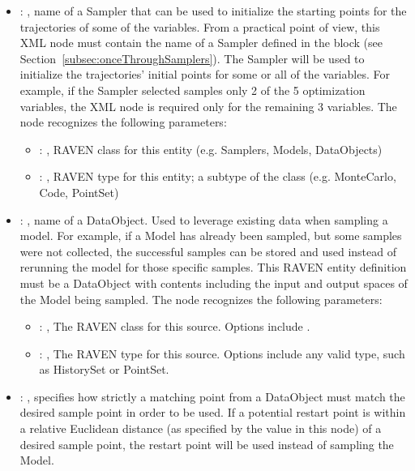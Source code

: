 \begin{itemize}
    \item {}: , 
      name of a Sampler that can be used to initialize the starting points for the trajectories
      of some of the variables. From a practical point of view, this XML node must contain the
      name of a Sampler defined in the  block (see
      Section~\ref{subsec:onceThroughSamplers}).               The Sampler will be used to
      initialize the trajectories' initial points for some or all               of the variables.
      For example, if the Sampler selected samples only 2 of the 5 optimization
      variables, the  XML node is required only for the remaining 3 variables.
      The  node recognizes the following parameters:
        \begin{itemize}
          \item {}: , 
            RAVEN class for this entity (e.g. Samplers, Models, DataObjects)
          \item {}: , 
            RAVEN type for this entity; a subtype of the class (e.g. MonteCarlo, Code, PointSet)
      \end{itemize}

    \item {}: , 
      name of a DataObject. Used to leverage existing data when sampling a model. For
      example, if a Model has               already been sampled, but some samples were not
      collected, the successful samples can               be stored and used instead of rerunning
      the model for those specific samples. This RAVEN               entity definition must be a
      DataObject with contents including the input and output spaces               of the Model
      being sampled.
      The  node recognizes the following parameters:
        \begin{itemize}
          \item {}: , 
            The RAVEN class for this source. Options include .
          \item {}: , 
            The RAVEN type for this source. Options include any valid  type,
            such as HistorySet or PointSet.
      \end{itemize}

    \item {}: , 
      specifies how strictly a matching point from a  DataObject must match
      the desired sample point in order to be used. If a potential restart point is within a
      relative Euclidean distance (as specified by the value in this node) of a desired sample
      point,               the restart point will be used instead of sampling the Model.


\end{itemize}
